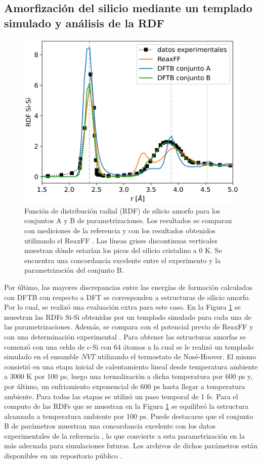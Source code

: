 \subsection{Amorfización del silicio mediante un templado simulado y análisis de la RDF}

\begin{figure}[h!]
    \centering
    \includegraphics[width=.7\textwidth]{Silicio/modelo/resultados/rdf/rdf.png}
    \caption{Función de distribución radial (RDF) de silicio amorfo para los
    conjuntos A y B de parametrizaciones. Los resultados se comparan con 
    mediciones de la referencia \cite{laaziri1999} y con los resultados obtenidos
    utilizando el ReaxFF \cite{fan2013}. Las líneas grises discontinuas verticales
    muestran dónde estarían los picos del silicio cristalino a 0 K. Se encuentra 
    una concordancia excelente entre el experimento y la parametrización del 
    conjunto B.}
    \label{fig:rdfb}
\end{figure}

Por último, las mayores discrepancias entre las energías de formación calculadas con DFTB
con respecto a DFT se corresponden a estructuras de silicio amorfo. Por lo cual,
se realizó una evaluación extra para este caso. En la Figura \ref{fig:rdfb} se 
muestran las RDFs Si-Si obtenidas por un templado simulado para cada una de las
parametrizaciones. Además, se compara con el potencial previo de ReaxFF 
\cite{fan2013} y con una determinación experimental \cite{laaziri1999}. Para 
obtener las estructuras amorfas se comenzó con una celda de c-Si con 64 átomos 
a la cual se le realizó un templado simulado en el ensamble $NVT$ utilizando el 
termostato de Nosé-Hoover. El mismo consistió en una etapa inicial de 
calentamiento lineal desde temperatura ambiente a 3000 K por 100 ps, luego una
termalización a dicha temperatura por 600 ps y, por último, un enfriamiento 
exponencial de 600 ps hasta llegar a temperatura ambiente. Para todas las etapas
se utilizó un paso temporal de 1 fs. Para el computo de las RDFs que se muestran
en la Figura \ref{fig:rdfb} se equilibró la estructura alcanzada a temperatura 
ambiente por 100 ps. Puede destacarse que el conjunto B de parámetros muestran
una concordancia excelente con los datos experimentales de la referencia 
\cite{laaziri1999}, lo que convierte a esta parametrización en la más adecuada
para simulaciones futuras. Los archivos de dichos parámetros están disponibles
en un repositorio público \cite{dftb_lisi}.
